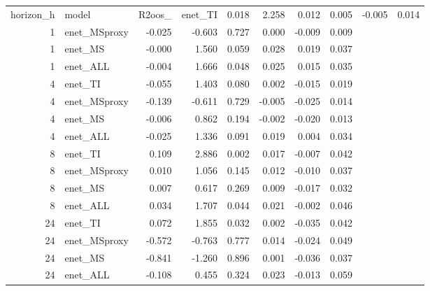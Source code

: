 \begin{tabular}{rlrrrrrr}
\toprule
horizon_h & model & R2oos_%
 & enet_TI & 0.018 & 2.258 & 0.012 & 0.005 & -0.005 & 0.014 \\
1 & enet_MSproxy & -0.025 & -0.603 & 0.727 & 0.000 & -0.009 & 0.009 \\
1 & enet_MS & -0.000 & 1.560 & 0.059 & 0.028 & 0.019 & 0.037 \\
1 & enet_ALL & -0.004 & 1.666 & 0.048 & 0.025 & 0.015 & 0.035 \\
4 & enet_TI & -0.055 & 1.403 & 0.080 & 0.002 & -0.015 & 0.019 \\
4 & enet_MSproxy & -0.139 & -0.611 & 0.729 & -0.005 & -0.025 & 0.014 \\
4 & enet_MS & -0.006 & 0.862 & 0.194 & -0.002 & -0.020 & 0.013 \\
4 & enet_ALL & -0.025 & 1.336 & 0.091 & 0.019 & 0.004 & 0.034 \\
8 & enet_TI & 0.109 & 2.886 & 0.002 & 0.017 & -0.007 & 0.042 \\
8 & enet_MSproxy & 0.010 & 1.056 & 0.145 & 0.012 & -0.010 & 0.037 \\
8 & enet_MS & 0.007 & 0.617 & 0.269 & 0.009 & -0.017 & 0.032 \\
8 & enet_ALL & 0.034 & 1.707 & 0.044 & 0.021 & -0.002 & 0.046 \\
24 & enet_TI & 0.072 & 1.855 & 0.032 & 0.002 & -0.035 & 0.042 \\
24 & enet_MSproxy & -0.572 & -0.763 & 0.777 & 0.014 & -0.024 & 0.049 \\
24 & enet_MS & -0.841 & -1.260 & 0.896 & 0.001 & -0.036 & 0.037 \\
24 & enet_ALL & -0.108 & 0.455 & 0.324 & 0.023 & -0.013 & 0.059 \\
\bottomrule
\end{tabular}
